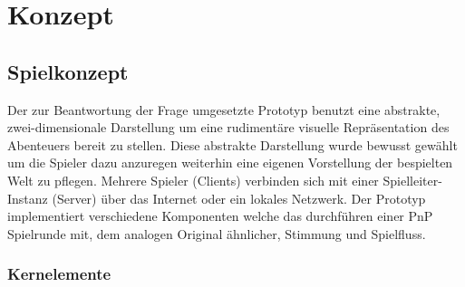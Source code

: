 \chapter{Konzept}
\label{concept}


\section{Spielkonzept}
\label{sec:Grobkonzept}
Der zur Beantwortung der Frage umgesetzte Prototyp benutzt eine abstrakte, zwei-dimensionale Darstellung um eine rudimentäre visuelle Repräsentation des Abenteuers bereit zu stellen. Diese abstrakte Darstellung wurde bewusst gewählt um die Spieler dazu anzuregen weiterhin eine eigenen Vorstellung der bespielten Welt zu pflegen. Mehrere Spieler (Clients) verbinden sich mit einer Spielleiter-Instanz (Server) über das Internet  oder ein lokales Netzwerk. Der Prototyp implementiert verschiedene Komponenten welche das durchführen einer PnP Spielrunde mit, dem analogen Original ähnlicher, Stimmung und Spielfluss.



\subsection{Kernelemente}


